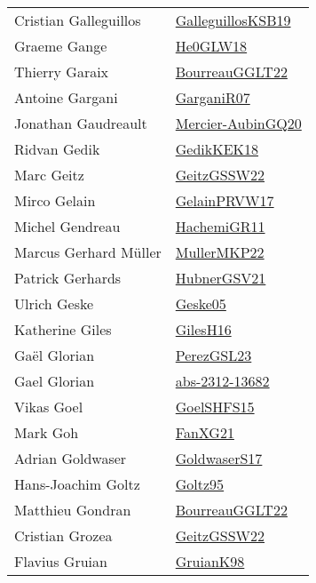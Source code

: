 {\begin{longtable}{p{4cm}p{20cm}}
Cristian Galleguillos & \href{papers/GalleguillosKSB19.pdf}{GalleguillosKSB19}\cite{GalleguillosKSB19} \\
Graeme Gange & \href{papers/He0GLW18.pdf}{He0GLW18}\cite{He0GLW18} \\
Thierry Garaix & \href{articles/BourreauGGLT22.pdf}{BourreauGGLT22}\cite{BourreauGGLT22} \\
Antoine Gargani & \href{papers/GarganiR07.pdf}{GarganiR07}\cite{GarganiR07} \\
Jonathan Gaudreault & \href{papers/Mercier-AubinGQ20.pdf}{Mercier-AubinGQ20}\cite{Mercier-AubinGQ20} \\
Ridvan Gedik & \href{articles/GedikKEK18.pdf}{GedikKEK18}\cite{GedikKEK18} \\
Marc Geitz & \href{papers/GeitzGSSW22.pdf}{GeitzGSSW22}\cite{GeitzGSSW22} \\
Mirco Gelain & \href{papers/GelainPRVW17.pdf}{GelainPRVW17}\cite{GelainPRVW17} \\
Michel Gendreau & \href{articles/HachemiGR11.pdf}{HachemiGR11}\cite{HachemiGR11} \\
Marcus Gerhard M{\"{u}}ller & \href{articles/MullerMKP22.pdf}{MullerMKP22}\cite{MullerMKP22} \\
Patrick Gerhards & \href{articles/HubnerGSV21.pdf}{HubnerGSV21}\cite{HubnerGSV21} \\
Ulrich Geske & \href{papers/Geske05.pdf}{Geske05}\cite{Geske05} \\
Katherine Giles & \href{papers/GilesH16.pdf}{GilesH16}\cite{GilesH16} \\
Ga{\"{e}}l Glorian & \href{papers/PerezGSL23.pdf}{PerezGSL23}\cite{PerezGSL23} \\
Gael Glorian & \href{articles/abs-2312-13682.pdf}{abs-2312-13682}\cite{abs-2312-13682} \\
Vikas Goel & \href{articles/GoelSHFS15.pdf}{GoelSHFS15}\cite{GoelSHFS15} \\
Mark Goh & \href{articles/FanXG21.pdf}{FanXG21}\cite{FanXG21} \\
Adrian Goldwaser & \href{papers/GoldwaserS17.pdf}{GoldwaserS17}\cite{GoldwaserS17} \\
Hans{-}Joachim Goltz & \href{papers/Goltz95.pdf}{Goltz95}\cite{Goltz95} \\
Matthieu Gondran & \href{articles/BourreauGGLT22.pdf}{BourreauGGLT22}\cite{BourreauGGLT22} \\
Cristian Grozea & \href{papers/GeitzGSSW22.pdf}{GeitzGSSW22}\cite{GeitzGSSW22} \\
Flavius Gruian & \href{papers/GruianK98.pdf}{GruianK98}\cite{GruianK98} \\

\end{longtable}}
